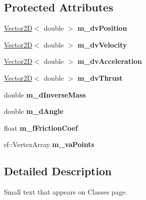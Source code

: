 \subsection*{Protected Attributes}
\begin{DoxyCompactItemize}
\item 
\hypertarget{class_collidable_aa9b3dd6f54428c0e538eb75a5166dd93}{}\hyperlink{class_vector2_d}{Vector2\+D}$<$ double $>$ {\bfseries m\+\_\+dv\+Position}\label{class_collidable_aa9b3dd6f54428c0e538eb75a5166dd93}

\item 
\hypertarget{class_collidable_ab7f405cb0f44372741baff129eabb8a8}{}\hyperlink{class_vector2_d}{Vector2\+D}$<$ double $>$ {\bfseries m\+\_\+dv\+Velocity}\label{class_collidable_ab7f405cb0f44372741baff129eabb8a8}

\item 
\hypertarget{class_collidable_abda695eecdb275f43bdb9fce1f58ef09}{}\hyperlink{class_vector2_d}{Vector2\+D}$<$ double $>$ {\bfseries m\+\_\+dv\+Acceleration}\label{class_collidable_abda695eecdb275f43bdb9fce1f58ef09}

\item 
\hypertarget{class_collidable_aa8bc9d03ab2be264b819053f347c432a}{}\hyperlink{class_vector2_d}{Vector2\+D}$<$ double $>$ {\bfseries m\+\_\+dv\+Thrust}\label{class_collidable_aa8bc9d03ab2be264b819053f347c432a}

\item 
\hypertarget{class_collidable_aa6b2bd9cb61b6f410e94c43e1ae25abc}{}double {\bfseries m\+\_\+d\+Inverse\+Mass}\label{class_collidable_aa6b2bd9cb61b6f410e94c43e1ae25abc}

\item 
\hypertarget{class_collidable_ad3a6769c49a8d2ee0b0434849952dcb2}{}double {\bfseries m\+\_\+d\+Angle}\label{class_collidable_ad3a6769c49a8d2ee0b0434849952dcb2}

\item 
\hypertarget{class_collidable_a5bd36e96a0f829735da7c5747a8df5f0}{}float {\bfseries m\+\_\+f\+Friction\+Coef}\label{class_collidable_a5bd36e96a0f829735da7c5747a8df5f0}

\item 
\hypertarget{class_collidable_a13a62d6d9fb69397c5ad03e6ec1c3b2d}{}sf\+::\+Vertex\+Array {\bfseries m\+\_\+va\+Points}\label{class_collidable_a13a62d6d9fb69397c5ad03e6ec1c3b2d}

\end{DoxyCompactItemize}


\subsection{Detailed Description}
Small text that appears on Classes page. 

